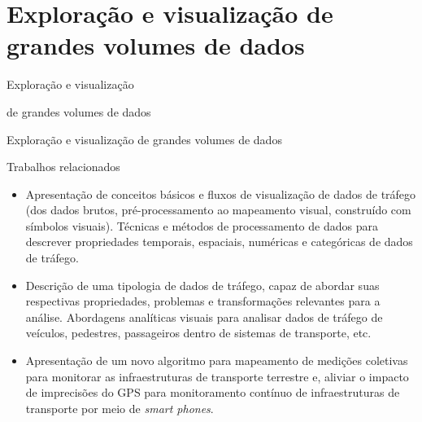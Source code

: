 \documentclass{beamer}
\begin{document}
\section{Exploração e visualização de grandes volumes de dados}
\begin{frame}
\Huge{\centerline{Exploração e visualização}}
\Huge{\centerline{de grandes volumes de dados}}
\end{frame}
\begin{frame}{Exploração e visualização de grandes volumes de dados}
\begin{block}{Trabalhos relacionados}
\begin{itemize}
\item Apresentação de conceitos básicos e fluxos de visualização de dados de tráfego (dos dados brutos, pré-processamento ao mapeamento visual, construído com símbolos visuais). Técnicas e métodos de processamento de dados para descrever propriedades temporais, espaciais, numéricas e categóricas de dados de tráfego.
\item Descrição de uma tipologia de dados de tráfego, capaz de abordar suas respectivas propriedades, problemas e transformações relevantes para a análise. Abordagens analíticas visuais para analisar dados de tráfego de veículos, pedestres, passageiros dentro de sistemas de transporte, etc.
\item Apresentação de um novo algoritmo para mapeamento de medições coletivas para monitorar as infraestruturas de transporte terrestre e, aliviar o impacto de imprecisões do GPS para monitoramento contínuo de infraestruturas de transporte por meio de \textit{smart phones}.
\end{itemize}
\end{block}
\end{frame}
\end{document}
